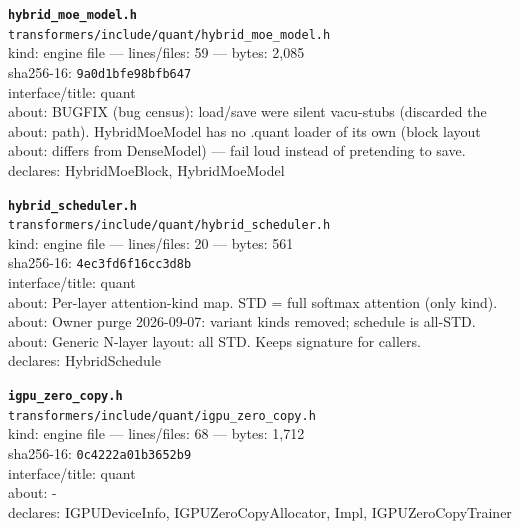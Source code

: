\noindent\textbf{\texttt{hybrid\_moe\_model.h}}\\
\texttt{transformers/include/quant/hybrid\_moe\_model.h}\\
kind: engine file --- lines/files: 59 --- bytes: 2,085\\
sha256-16: \texttt{9a0d1bfe98bfb647}\\
interface/title: quant\\
about: BUGFIX (bug census): load/save were silent vacu-stubs (discarded the\\
about: path). HybridMoeModel has no .quant loader of its own (block layout\\
about: differs from DenseModel) — fail loud instead of pretending to save.\\
declares: HybridMoeBlock, HybridMoeModel\\
\vspace*{6.0pt}

\noindent\textbf{\texttt{hybrid\_scheduler.h}}\\
\texttt{transformers/include/quant/hybrid\_scheduler.h}\\
kind: engine file --- lines/files: 20 --- bytes: 561\\
sha256-16: \texttt{4ec3fd6f16cc3d8b}\\
interface/title: quant\\
about: Per-layer attention-kind map. STD = full softmax attention (only kind).\\
about: Owner purge 2026-09-07: variant kinds removed; schedule is all-STD.\\
about: Generic N-layer layout: all STD. Keeps signature for callers.\\
declares: HybridSchedule\\
\vspace*{6.0pt}

\noindent\textbf{\texttt{igpu\_zero\_copy.h}}\\
\texttt{transformers/include/quant/igpu\_zero\_copy.h}\\
kind: engine file --- lines/files: 68 --- bytes: 1,712\\
sha256-16: \texttt{0c4222a01b3652b9}\\
interface/title: quant\\
about: -\\
declares: IGPUDeviceInfo, IGPUZeroCopyAllocator, Impl, IGPUZeroCopyTrainer\\
\vspace*{6.0pt}
\newpage

